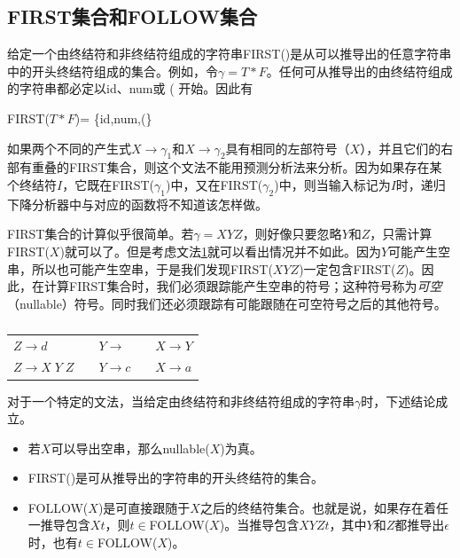 \documentclass[cn,11pt,chinese]{elegantbook}
\begin{document}
\subsection{FIRST集合和FOLLOW集合}

给定一个由终结符和非终结符组成的字符串FIRST()是从可以推导出的任意字符串中的开头终结符组成的集合。例如，令$\gamma=T*F$。任何可从推导出的由终结符组成的字符串都必定以id、num或 ( 开始。因此有

FIRST($T*F$)= \{id,num,(\}

如果两个不同的产生式$X\rightarrow \gamma_1$和$X\rightarrow \gamma_2$具有相同的左部符号（$X$），并且它们的右部有重叠的FIRST集合，则这个文法不能用预测分析法来分析。因为如果存在某个终结符$I$，它既在FIRST($\gamma_1$)中，又在FIRST($\gamma_2$)中，则当输入标记为$I$时，递归下降分析器中与对应的函数将不知道该怎样做。

FIRST集合的计算似乎很简单。若$\gamma=XYZ$，则好像只要忽略$Y$和$Z$，只需计算FIRST($X$)就可以了。但是考虑文法\ref{grammar:3-6}就可以看出情况并不如此。因为$Y$可能产生空串，所以也可能产生空串，于是我们发现FIRST($XYZ$)一定包含FIRST($Z$)。因此，在计算FIRST集合时，我们必须跟踪能产生空串的符号；这种符号称为\textit{可空}（nullable）符号。同时我们还必须跟踪有可能跟随在可空符号之后的其他符号。

\renewcommand\tablename{文法}
\begin{table}[htbp]
  \centering
  \begin{tabular}{lllll}
    \toprule
    $Z \rightarrow d$ & \quad & $Y \rightarrow  $ & \quad & $X \rightarrow Y$ \\
    $Z \rightarrow X \; Y \; Z$ & \quad & $Y \rightarrow c$ & \quad & $X \rightarrow a$ \\
    \bottomrule
  \end{tabular}
  \caption{}
  \label{grammar:3-6}
\end{table}
\renewcommand\tablename{表}

对于一个特定的文法，当给定由终结符和非终结符组成的字符串$\gamma$时，下述结论成立。

\begin{itemize}
\item 若$X$可以导出空串，那么nullable($X$)为真。
\item FIRST()是可从推导出的字符串的开头终结符的集合。
\item FOLLOW($X$)是可直接跟随于$X$之后的终结符集合。也就是说，如果存在着任一推导包含$Xt$，则$t\in$FOLLOW($X$)。当推导包含$XYZt$，其中$Y$和$Z$都推导出$\epsilon$时，也有$t\in$FOLLOW($X$)。
\end{itemize}
\end{document}
